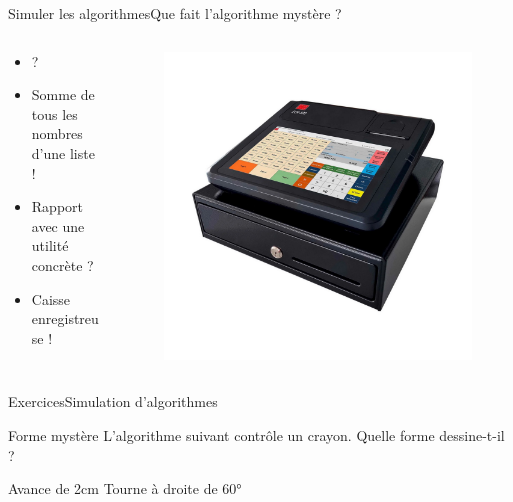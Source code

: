 \documentclass{beamer}
\begin{document}
\begin{frame}{Simuler les algorithmes}{Que fait l'algorithme mystère ?}
	\begin{columns}
		\begin{column}{0.7\textwidth}
			\begin{itemize}
				\item ? \pause
				\item Somme de tous les nombres d'une liste ! \pause
				\item Rapport avec une utilité concrète ? \pause
				\item Caisse enregistreuse !
			\end{itemize}
		\end{column}
		\begin{column}{0.3\textwidth}
			\begin{figure}
				\includegraphics[width=1\linewidth]{caisse.jpeg}
			\end{figure}
		\end{column}
	\end{columns}
\end{frame}

\begin{frame}{Exercices}{Simulation d'algorithmes}
	\begin{alertblock}{Forme mystère}
		L’algorithme suivant contrôle un crayon. Quelle forme dessine-t-il ?
		\begin{algorithmic}[1]
			\REPEAT
			\STATE Avance de 2cm
			\STATE Tourne à droite de 60°
		\end{algorithmic}
	\end{alertblock}
\end{frame}
\end{document}
